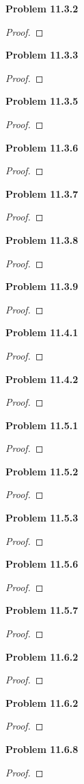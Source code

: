 \documentclass[12pt]{article}
\begin{document}
\textbf{Problem 11.3.2}
\begin{proof}

\end{proof}

\textbf{Problem 11.3.3}
\begin{proof}

\end{proof}

\textbf{Problem 11.3.5}
\begin{proof}

\end{proof}

\textbf{Problem 11.3.6}
\begin{proof}

\end{proof}

\textbf{Problem 11.3.7}
\begin{proof}

\end{proof}

\textbf{Problem 11.3.8}
\begin{proof}

\end{proof}

\textbf{Problem 11.3.9}
\begin{proof}

\end{proof}

\textbf{Problem 11.4.1}
\begin{proof}

\end{proof}

\textbf{Problem 11.4.2}
\begin{proof}

\end{proof}

\textbf{Problem 11.5.1}
\begin{proof}

\end{proof}

\textbf{Problem 11.5.2}
\begin{proof}

\end{proof}

\textbf{Problem 11.5.3}
\begin{proof}

\end{proof}
\textbf{Problem 11.5.6}
\begin{proof}

\end{proof}
\textbf{Problem 11.5.7}
\begin{proof}

\end{proof}
\textbf{Problem 11.6.2}
\begin{proof}

\end{proof}
\textbf{Problem 11.6.2}
\begin{proof}

\end{proof}
\textbf{Problem 11.6.8}
\begin{proof}

\end{proof}
\end{document}
